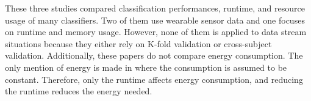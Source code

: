 These three studies compared classification
performances, runtime, and resource usage of many
classifiers. Two of them use wearable sensor data
and one focuses on runtime and memory usage.
However, none of them is applied to data stream
situations because they either rely on K-fold
validation or cross-subject validation.
Additionally, these papers do not compare energy
consumption. The only mention of energy is made in
\cite{omid_2019} where the consumption is assumed to be
constant. Therefore, only the runtime affects 
energy consumption, and reducing the runtime
reduces the energy needed.


